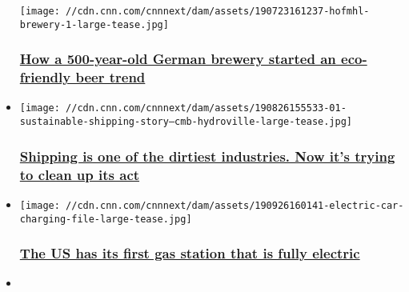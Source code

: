 \begin{itemize}
  \texttt{[image: //cdn.cnn.com/cnnnext/dam/assets/190723161237-hofmhl-brewery-1-large-tease.jpg]}

  \hypertarget{how-a-500-year-old-german-brewery-started-an-eco-friendly-beer-trend-}{%
  \subsubsection{\texorpdfstring{\href{/2019/10/08/business/german-beer-renewable-energy/index.html}{How
  a 500-year-old German brewery started an eco-friendly beer trend
  }}{How a 500-year-old German brewery started an eco-friendly beer trend }}\label{how-a-500-year-old-german-brewery-started-an-eco-friendly-beer-trend-}}
\item
  \href{/2019/10/03/business/global-shipping-climate-crisis-intl/index.html}{}

  \texttt{[image: //cdn.cnn.com/cnnnext/dam/assets/190826155533-01-sustainable-shipping-story---cmb-hydroville-large-tease.jpg]}

  \hypertarget{shipping-is-one-of-the-dirtiest-industries-now-its-trying-to-clean-up-its-act}{%
  \subsubsection{\texorpdfstring{\href{/2019/10/03/business/global-shipping-climate-crisis-intl/index.html}{Shipping
  is one of the dirtiest industries. Now it's trying to clean up its
  act}}{Shipping is one of the dirtiest industries. Now it's trying to clean up its act}}\label{shipping-is-one-of-the-dirtiest-industries-now-its-trying-to-clean-up-its-act}}
\item
  \href{/2019/09/27/us/maryland-electric-vehicle-charging-trnd/index.html}{}

  \texttt{[image: //cdn.cnn.com/cnnnext/dam/assets/190926160141-electric-car-charging-file-large-tease.jpg]}

  \hypertarget{the-us-has-its-first-gas-station-that-is-fully-electric}{%
  \subsubsection{\texorpdfstring{\href{/2019/09/27/us/maryland-electric-vehicle-charging-trnd/index.html}{The
  US has its first gas station that is fully
  electric}}{The US has its first gas station that is fully electric}}\label{the-us-has-its-first-gas-station-that-is-fully-electric}}
\item
  \href{/2019/09/13/business/china-nuclear-climate-intl-hnk/index.html}{}


\end{itemize}
